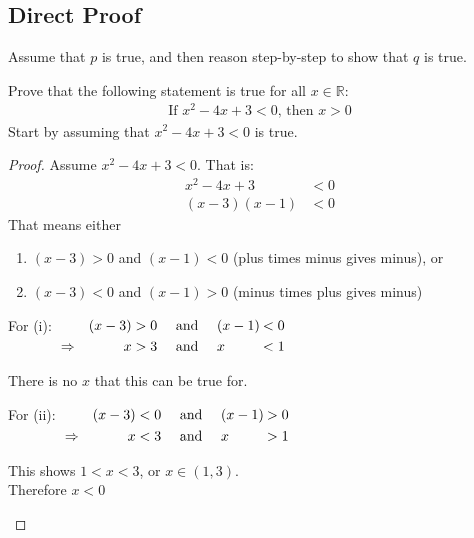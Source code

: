 \documentclass[../notes.tex]{subfiles}
\begin{document}
			\subsection{Direct Proof}
				Assume that $p$ is true, and then reason step-by-step to show that $q$ is true.
				\begin{example}
					Prove that the following statement is true for all $x \in \mathbb{R}$:
					\begin{align*}
						\text{If } x^{2} - 4x + 3 < 0 \text{, then } x > 0
					\end{align*}
					Start by assuming that $x^{2} - 4x + 3 < 0$ is true.
					\begin{proof}
						Assume $x^{2} - 4x + 3 < 0$. That is:
						\begin{align*}
							x^{2} - 4x + 3 &< 0\\
							(x - 3)(x - 1) &< 0 \tag*{(by factorisation)}
						\end{align*}
						That means either 
							\begin{enumerate}[label=(\roman*)]
								\item $(x - 3) > 0$ and $(x - 1) < 0$ (plus times minus gives minus), or
								\item $(x - 3) < 0$ and $(x - 1) > 0$ (minus times plus gives minus)
							\end{enumerate}
						For (i):
						$ \begin{alignedat}[t]{3}
								& & (x - 3) &> 0 \quad \text{ and }\quad  (x - 1) \: &< 0\\
								& \Rightarrow \quad & x &> 3 \quad \text{ and } \quad x &< 1
							\end{alignedat} $
						\begin{indentparagraph}
							There is no $x$ that this can be true for.
						\end{indentparagraph}
						For (ii):
						$ \begin{alignedat}[t]{3}
								& & (x - 3) &< 0 \quad \text{ and }\quad  (x - 1) \: &> 0\\
								& \Rightarrow \quad & x &< 3 \quad \text{ and } \quad x &> 1
						\end{alignedat} $
							\begin{indentparagraph}
								This shows $1 < x < 3$, or $x \in (1, 3)$.\\
								Therefore $x < 0$
							\end{indentparagraph}
					\end{proof}
				\end{example}
			\pagebreak
\end{document}
